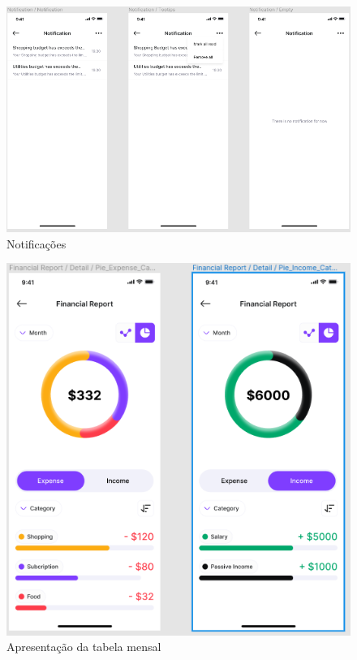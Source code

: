 \begin{figure}[!htb]
    \centering
    \caption{Notificações}
    \includegraphics[scale=0.6]{images/notification.png}
\end{figure}


\begin{figure}[!htb]
    \centering
    \caption{Apresentação da tabela mensal}
    \includegraphics[scale=0.6]{images/expense-table.png}
\end{figure}

